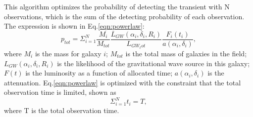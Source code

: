 \documentclass[twocolumn]{aastex61}
\begin{document}
This algorithm optimizes the probability of detecting the transient with N observations, which is the sum of the detecting probability of each observation. The expression is shown in Eq.\ref{eqn:powerlaw}:
\begin{equation}\label{eqn:powerlaw}
p_{tot}=\Sigma_{i=1}^N \frac{M_i}{M_{tot}}\frac{L_{GW}(\alpha_i, \delta_i, R_i)}{L_{GW_tot}}\frac{F_i(t_i)}{a(\alpha_i, \delta_i)},
\end{equation}
where $M_i$ is the mass for galaxy $i$; $M_{tot}$ is the total mass of galaxies in the field; $L_{GW}(\alpha_i, \delta_i, R_i)$ is the likelihood of the gravitational wave source in this galaxy; $F(t)$ is the luminosity as a function of allocated time; $a(\alpha_i, \delta_i)$ is the attenuation. Eq.\ref{eqn:powerlaw} is optimized with the constraint that the total observation time is limited, shown as
\begin{equation}
\Sigma_{i=1}^N t_i=T,
\end{equation}
where T is the total observation time.
\end{document}
